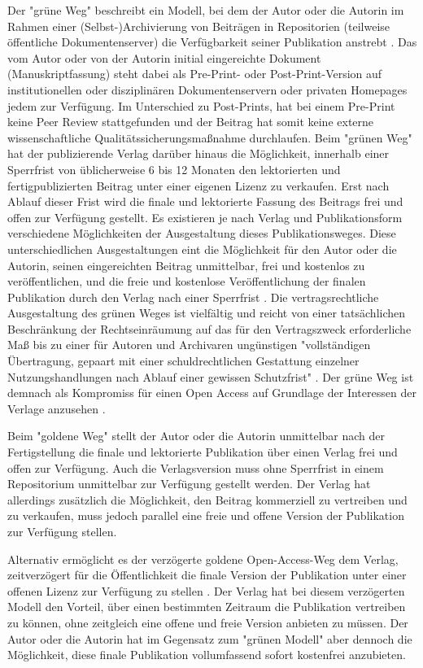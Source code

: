 Der "grüne Weg" beschreibt ein Modell, bei dem der Autor oder die Autorin im Rahmen einer (Selbst-)Archivierung von Beiträgen in Repositorien (teilweise öffentliche Dokumentenserver) die Verfügbarkeit seiner Publikation anstrebt \cite{Brembs_2015} \cite{Mueller_2010} \cite{Grand_2012}. Das vom Autor oder von der Autorin initial eingereichte Dokument (Manuskriptfassung) steht dabei als Pre-Print- oder Post-Print-Version auf institutionellen oder disziplinären Dokumentenservern oder privaten Homepages jedem zur Verfügung. Im Unterschied zu Post-Prints, hat bei einem Pre-Print keine Peer Review stattgefunden und der Beitrag hat somit keine externe wissenschaftliche Qualitätssicherungsmaßnahme durchlaufen. Beim "grünen Weg" hat der publizierende Verlag darüber hinaus die Möglichkeit, innerhalb einer Sperrfrist von üblicherweise 6 bis 12 Monaten den lektorierten und fertigpublizierten Beitrag unter einer eigenen Lizenz zu verkaufen. Erst nach Ablauf dieser Frist wird die finale und lektorierte Fassung des Beitrags frei und offen zur Verfügung gestellt. Es existieren je nach Verlag und Publikationsform verschiedene Möglichkeiten der Ausgestaltung dieses Publikationsweges. Diese unterschiedlichen Ausgestaltungen eint die Möglichkeit für den Autor oder die Autorin, seinen eingereichten Beitrag unmittelbar, frei und kostenlos zu veröffentlichen, und die freie und kostenlose Veröffentlichung der finalen Publikation durch den Verlag nach einer Sperrfrist \cite{Dorschel_2006}. Die vertragsrechtliche Ausgestaltung des grünen Weges ist vielfältig und reicht von einer tatsächlichen Beschränkung der Rechtseinräumung auf das für den Vertragszweck erforderliche Maß bis zu einer für Autoren und Archivaren ungünstigen "vollständigen Übertragung, gepaart mit einer schuldrechtlichen Gestattung einzelner Nutzungshandlungen nach Ablauf einer gewissen Schutzfrist" \cite{Dorschel_2006}. Der grüne Weg ist demnach als Kompromiss für einen Open Access auf Grundlage der Interessen der Verlage anzusehen \cite{Mussell_2013}.

Beim "goldene Weg" stellt der Autor oder die Autorin unmittelbar nach der Fertigstellung die finale und lektorierte Publikation über einen Verlag frei und offen zur Verfügung. Auch die Verlagsversion muss ohne Sperrfrist in einem Repositorium unmittelbar zur Verfügung gestellt werden. Der Verlag hat allerdings zusätzlich die Möglichkeit, den Beitrag kommerziell zu vertreiben und zu verkaufen, muss jedoch parallel eine freie und offene Version der Publikation zur Verfügung stellen.

Alternativ ermöglicht es der verzögerte goldene Open-Access-Weg dem Verlag, zeitverzögert für die Öffentlichkeit die finale Version der Publikation unter einer offenen Lizenz zur Verfügung zu stellen \cite{Lewis_2012}. Der Verlag hat bei diesem verzögerten Modell den Vorteil, über einen bestimmten Zeitraum die Publikation vertreiben zu können, ohne zeitgleich eine offene und freie Version anbieten zu müssen. Der Autor oder die Autorin hat im Gegensatz zum "grünen Modell" aber dennoch die Möglichkeit, diese finale Publikation vollumfassend sofort kostenfrei anzubieten.

